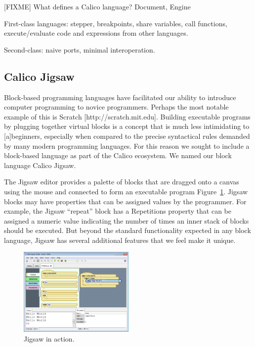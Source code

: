 \documentclass[preprint]{sigplanconf}
\begin{document}
[FIXME] What defines a Calico language? Document, Engine

First-class languages: stepper, breakpoints, share variables, call
functions, execute/evaluate code and expressions from other languages.

Second-class: naive ports, minimal interoperation.

\subsection{Calico Jigsaw}

Block-based programming languages have facilitated our ability to
introduce computer programming to novice programmers. Perhaps the most
notable example of this is Scratch [http://scratch.mit.edu]. Building
executable programs by plugging together virtual blocks is a concept
that is much less intimidating to [a]beginners, especially when
compared to the precise syntactical rules demanded by many modern
programming languages. For this reason we sought to include a
block-based language as part of the Calico ecosystem. We named our
block language Calico Jigsaw.

The Jigsaw editor provides a palette of blocks that are dragged onto a
canvas using the mouse and connected to form an executable program
Figure~\ref{jigsaw1}. Jigsaw blocks may have properties that can be assigned
values by the programmer. For example, the Jigsaw ``repeat'' block has
a Repetitions property that can be assigned a numeric value indicating
the number of times an inner stack of blocks should be executed. But
beyond the standard functionality expected in any block language,
Jigsaw has several additional features that we feel make it unique.

\begin{figure}[h!]
  \centering
     \includegraphics[width=0.5\textwidth]{jigsaw1.eps}
  \caption{Jigsaw in action.}
  \label{jigsaw1}
\end{figure}
\end{document}
